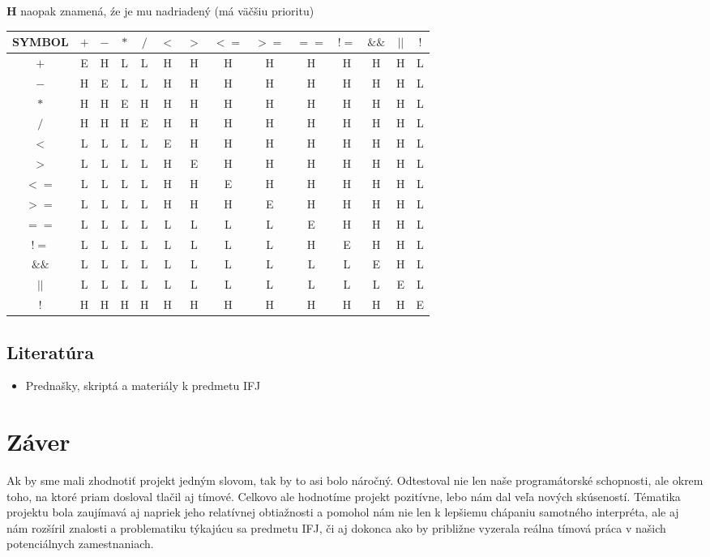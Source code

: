 \documentclass[12pt, a4paper]{article}
\begin{document}
        \textbf{H} naopak znamená, źe je mu nadriadený (má väčšiu prioritu)

        \begin{center}
            \begin{tabular}{| c | c | c | c | c | c | c | c | c | c | c | c | c | c |}
            \hline
            SYMBOL & $+$ & $-$ & $*$ & $/$ & $<$ & $>$ & $<=$ & $>=$ & $==$ & $!=$ & $\&\&$ & $||$ & $!$\\
            \hline
            $+$ & E & H & L & L & H & H & H & H & H & H & H & H & L\\
            $-$ & H & E & L & L & H & H & H & H & H & H & H & H & L\\
            $*$ & H & H & E & H & H & H & H & H & H & H & H & H & L\\
            $/$ & H & H & H & E & H & H & H & H & H & H & H & H & L\\
            $<$ & L & L & L & L & E & H & H & H & H & H & H & H & L\\
            $>$ & L & L & L & L & H & E & H & H & H & H & H & H & L\\
            $<=$ & L & L & L & L & H & H & E & H & H & H & H & H & L\\
            $>=$ & L & L & L & L & H & H & H & E & H & H & H & H & L\\
            $==$ & L & L & L & L & L & L & L & L & E & H & H & H & L\\
            $!=$ & L & L & L & L & L & L & L & L & H & E & H & H & L\\
            $\&\&$ & L & L & L & L & L & L & L & L & L & L & E & H & L\\
            $||$ & L & L & L & L & L & L & L & L & L & L & L & E & L\\
            $!$ & H & H & H & H & H & H & H & H & H & H & H & H & E\\
            \hline
            \end{tabular}
        \end{center}
        \subsection{Literatúra}
        \begin{itemize}
            \item Prednašky, skriptá a materiály k predmetu IFJ
        \end{itemize}
        \newpage
    \section{Záver}
    Ak by sme mali zhodnotiť projekt jedným slovom, tak by to asi bolo náročný. Odtestoval nie len naše programátorské schopnosti, ale okrem toho, na ktoré priam dosloval tlačil aj tímové. Celkovo ale hodnotíme projekt pozitívne, lebo nám dal veľa nových skúseností. Tématika projektu bola zaujímavá aj napriek jeho relatívnej obtiažnosti a pomohol nám nie len k lepšiemu chápaniu samotného interpréta, ale aj nám rozšíril znalosti a problematiku týkajúcu sa predmetu IFJ, či aj dokonca ako by približne vyzerala reálna tímová práca v našich potenciálnych zamestnaniach.
\end{document}
